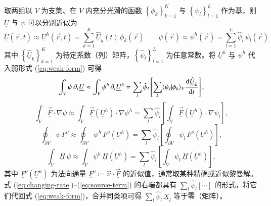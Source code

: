 取两组以 $V$ 为支集、在 $V$ 内充分光滑的函数 $\left\{ \phi_{k}\right\} _{k=1}^{K}$
与 $\left\{ \psi_{l}\right\} _{l=1}^{L}$ 作为基，则 $\underline{U}$ 与
$\psi$ 可以分别近似为
\begin{equation}
\underline{U}(\vec{r},t)\approx\underline{U}^{h}(\vec{r},t)=\sum_{k=1}^{K}\underline{\hat{U}}_{k}(t)\,\phi_{k}(\vec{r})\qquad\psi(\vec{r})\approx\psi^{h}(\vec{r})=\sum_{l=1}^{L}\hat{\psi}_{l}\,\psi_{l}(\vec{r})
\end{equation}
其中 $\left\{ \underline{\hat{U}}_{k}\right\} _{k=1}^{K}$ 为待定系数（列）矩阵，$\left\{ \hat{\psi}_{l}\right\} _{l=1}^{L}$
为任意常数。将 $\underline{U}^{h}$ 与 $\psi^{h}$ 代入弱形式 (\ref{eq:weak-form})
可得
\begin{equation}
\int_{V}\psi\,\partial_{t}\underline{U}\approx\int_{V}\psi^{h}\,\partial_{t}\underline{U}^{h}=\sum_{l}\hat{\psi}_{l}\left[\sum_{k}\langle\psi_{l}\vert\phi_{k}\rangle_{V}\dv{\underline{\hat{U}}_{k}}{t}\right],\label{eq:changing-rate}
\end{equation}
\begin{equation}
\int_{V}\underline{\vec{F}}\cdot\nabla\psi\approx\int_{V}\mathopen{\underline{\vec{F}}}\left(\underline{U}^{h}\right)\cdot\nabla\psi^{h}=\sum_{l}\hat{\psi}_{l}\left[\int_{V}\mathopen{\underline{\vec{F}}}\left(\underline{U}^{h}\right)\cdot\nabla\psi_{l}\right],\label{eq:internal-flux}
\end{equation}
\begin{equation}
\oint_{\partial V}\psi\,\underline{F}^{\nu}\approx\oint_{\partial V}\psi^{h}\,\mathopen{\underline{F}^{\nu}}\left(\underline{U}^{h}\right)=\sum_{l}\hat{\psi}_{l}\left[\oint_{\partial V}\psi_{l}\,\mathopen{\underline{F}^{\nu}}\left(\underline{U}^{h}\right)\right],\label{eq:boundary-flux}
\end{equation}
\begin{equation}
\int_{V}\underline{H}\,\psi\approx\int_{V}\psi^{h}\,\mathopen{\underline{H}}\left(\underline{U}^{h}\right)=\sum_{l}\hat{\psi}_{l}\left[\int_{V}\psi_{l}\,\mathopen{\underline{H}}\left(\underline{U}^{h}\right)\right],\label{eq:source-term}
\end{equation}
其中 $\mathopen{\underline{F}^{\nu}}\left(\underline{U}^{h}\right)$
为法向通量 $\underline{F}^{\nu}\coloneqq\vec{\nu}\cdot\underline{\vec{F}}$
的近似值，通常取某种精确或近似黎曼解。式 (\ref{eq:changing-rate})–(\ref{eq:source-term})
的右端都具有 $\sum_{l}\hat{\psi}_{l}\left[\cdots\right]$ 的形式，将它们代回式 (\ref{eq:weak-form})，合并同类项可得
$\sum_{l}\hat{\psi}_{l}\,\underline{X}_{l}$ 等于零（矩阵）。

